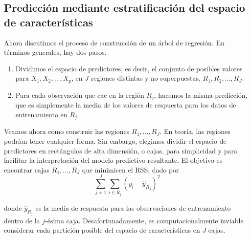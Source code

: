 \subsection{Predicción mediante estratificación del espacio de características}

Ahora discutimos el proceso de construcción de un árbol de regresión. En términos generales,
hay dos pasos.
\begin{enumerate}
\item Dividimos el espacio de predictores, es decir, el conjunto de posibles valores para $X_1, X_2, \ldots, X_p$, en $J$ regiones distintas y no superpuestas, $R_1, R_2, \ldots, R_J$.
\item Para cada observación que cae en la región $R_j$, hacemos la misma predicción, que es simplemente la media de los valores de respuesta para los datos de entrenamiento en $R_j$.
\end{enumerate}

Veamos ahora como construir las regiones $R_1, \ldots, R_J$. En teoría, las regiones podrían tener cualquier forma. Sin embargo, elegimos dividir el espacio de predictores en rectángulos de alta dimensión, o cajas, para simplicidad y para facilitar la interpretación del modelo predictivo resultante. El objetivo es encontrar cajas $R_1, \ldots, R_J$ que minimicen el RSS, dado por
\begin{equation}
\sum_{j=1}^{J} \sum_{i \in R_j} (y_i - \hat{y}_{R_j})^2 
\end{equation}

\noindent donde $\hat{y}_{R_j}$ es la media de respuesta para las observaciones de entrenamiento dentro de la $j$-ésima caja. Desafortunadamente, es computacionalmente inviable considerar cada partición posible del espacio de características en $J$ cajas. \\

